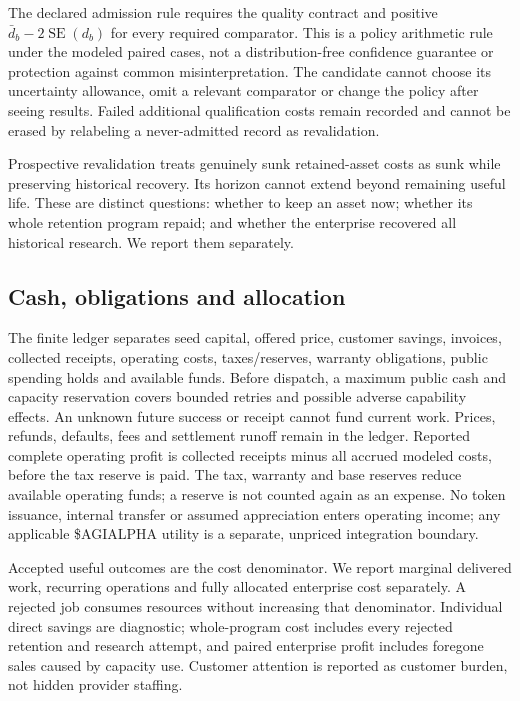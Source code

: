 \documentclass[11pt,letterpaper]{article}
\begin{document}
The declared admission rule requires the quality contract and positive $\bar d_b-2\operatorname{SE}(d_b)$ for every required comparator. This is a policy arithmetic rule under the modeled paired cases, not a distribution-free confidence guarantee or protection against common misinterpretation. The candidate cannot choose its uncertainty allowance, omit a relevant comparator or change the policy after seeing results. Failed additional qualification costs remain recorded and cannot be erased by relabeling a never-admitted record as revalidation.

Prospective revalidation treats genuinely sunk retained-asset costs as sunk while preserving historical recovery. Its horizon cannot extend beyond remaining useful life. These are distinct questions: whether to keep an asset now; whether its whole retention program repaid; and whether the enterprise recovered all historical research. We report them separately.

\subsection{Cash, obligations and allocation}

The finite ledger separates seed capital, offered price, customer savings, invoices, collected receipts, operating costs, taxes/reserves, warranty obligations, public spending holds and available funds. Before dispatch, a maximum public cash and capacity reservation covers bounded retries and possible adverse capability effects. An unknown future success or receipt cannot fund current work. Prices, refunds, defaults, fees and settlement runoff remain in the ledger. Reported complete operating profit is collected receipts minus all accrued modeled costs, before the tax reserve is paid. The tax, warranty and base reserves reduce available operating funds; a reserve is not counted again as an expense. No token issuance, internal transfer or assumed appreciation enters operating income; any applicable \$AGIALPHA utility is a separate, unpriced integration boundary.

Accepted useful outcomes are the cost denominator. We report marginal delivered work, recurring operations and fully allocated enterprise cost separately. A rejected job consumes resources without increasing that denominator. Individual direct savings are diagnostic; whole-program cost includes every rejected retention and research attempt, and paired enterprise profit includes foregone sales caused by capacity use. Customer attention is reported as customer burden, not hidden provider staffing.
\end{document}
